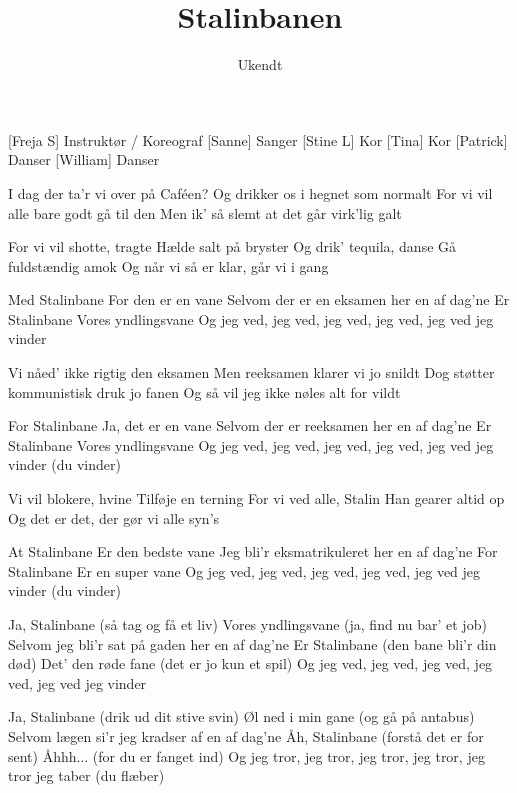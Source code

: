 \documentclass[a4paper,11pt]{article}
\title{Stalinbanen}
\author{Ukendt}
\begin{document}
\maketitle

\begin{roles}
[Freja S] Instruktør / Koreograf
[Sanne] Sanger
[Stine L] Kor
[Tina] Kor
[Patrick] Danser
[William] Danser
\end{roles}

\begin{song}
 I dag der ta'r vi over på Caféen?
Og drikker os i hegnet som normalt
For vi vil alle bare godt gå til den
Men ik' så slemt at det går virk'lig galt

 For vi vil shotte, tragte
Hælde salt på bryster
Og drik' tequila, danse
Gå fuldstændig amok
Og når vi så er klar, går vi i gang

 Med Stalinbane
For den er en vane
Selvom der er en eksamen her en af dag'ne
Er Stalinbane
Vores yndlingsvane
Og jeg ved, jeg ved, jeg ved, jeg ved, jeg ved jeg vinder

 Vi nåed' ikke rigtig den eksamen
Men reeksamen klarer vi jo snildt
Dog støtter kommunistisk druk jo fanen
Og så vil jeg ikke nøles alt for vildt

 For Stalinbane
Ja, det er en vane
Selvom der er reeksamen her en af dag'ne
Er Stalinbane
Vores yndlingsvane
Og jeg ved, jeg ved, jeg ved, jeg ved, jeg ved jeg vinder (du vinder)

 Vi vil blokere, hvine
Tilføje en terning
For vi ved alle, Stalin
Han gearer altid op
Og det er det, der gør vi alle syn's

 At Stalinbane
Er den bedste vane
Jeg bli'r eksmatrikuleret her en af dag'ne
For Stalinbane
Er en super vane
Og jeg ved, jeg ved, jeg ved, jeg ved, jeg ved jeg vinder (du vinder)

 Ja, Stalinbane (så tag og få et liv)
Vores yndlingsvane (ja, find nu bar' et job)
Selvom jeg bli'r sat på gaden her en af dag'ne
Er Stalinbane (den bane bli'r din død)
Det' den røde fane (det er jo kun et spil)
Og jeg ved, jeg ved, jeg ved, jeg ved, jeg ved jeg vinder

 Ja, Stalinbane (drik ud dit stive svin)
Øl ned i min gane (og gå på antabus)
Selvom lægen si'r jeg kradser af en af dag'ne
Åh, Stalinbane (forstå det er for sent)
Åhhh... (for du er fanget ind)
Og jeg tror, jeg tror, jeg tror, jeg tror, jeg tror jeg taber (du flæber)
\end{song}
\end{document}
